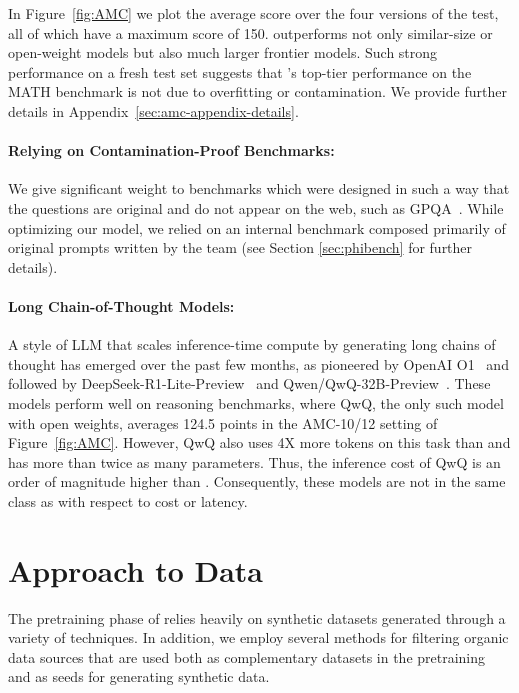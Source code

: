 In Figure~\ref{fig:AMC} we plot the average score over the four versions of the test, all of which have a maximum score of 150.  \model outperforms not only similar-size or open-weight models but also much larger frontier models. Such strong performance on a fresh test set suggests that \modelwithoutspace's top-tier performance on the MATH benchmark is not due to overfitting or contamination. We provide further details in Appendix~\ref{sec:amc-appendix-details}.

\paragraph{Relying on Contamination-Proof Benchmarks:}
We give significant weight to benchmarks which were designed in such a way that the questions are original and do not appear on the web, such as GPQA~\cite{rein2023gpqa}. While optimizing our model, we relied on an internal benchmark composed primarily of original prompts written by the team (see Section \ref{sec:phibench} for further details).

\paragraph{Long Chain-of-Thought Models:}
A style of LLM that scales inference-time compute by generating long chains of thought has emerged over the past few months, as pioneered by OpenAI O1~\cite{openai_learning_to_reason} and followed by DeepSeek-R1-Lite-Preview~\cite{deepseek_r1_lite_preview} and Qwen/QwQ-32B-Preview~\cite{qwq-32b-preview}.  These models perform well on reasoning benchmarks, where QwQ, the only such model with open weights, averages 124.5 points in the AMC-10/12 setting of Figure~\ref{fig:AMC}.  However, QwQ also uses 4X more tokens on this task than \model and has more than twice as many parameters.  Thus, the inference cost of QwQ is an order of magnitude higher than \modelwithoutspace.  Consequently, these models are not in the same class as \model with respect to cost or latency.

\section{Approach to Data}
The pretraining phase of \model relies heavily on synthetic datasets generated through a variety of techniques. In addition, we employ several methods for filtering organic data sources that are used both as complementary datasets in the pretraining and as seeds for generating synthetic data.

